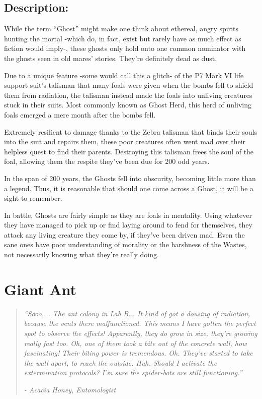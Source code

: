 \documentclass[11pt,a4paper,twocolumn]{book}
\begin{document}
	\subsection*{Description:}
	While the term ``Ghost'' might make one think about ethereal, angry spirits hunting the mortal -which do, in fact, exist but rarely have as much effect as fiction would imply-, these ghosts only hold onto one common nominator with the ghosts seen in old mares' stories. They're definitely dead as dust. 
	
	Due to a unique feature -some would call this a glitch- of the P7 Mark VI life support suit's talisman that many foals were given when the bombs fell to shield them from radiation, the talisman instead made the foals into unliving creatures stuck in their suits. Most commonly known as Ghost Herd, this herd of unliving foals emerged a mere month after the bombs fell.
	
	\bigskip
	Extremely resilient to damage thanks to the Zebra talisman that binds their souls into the suit and repairs them, these poor creatures often went mad over their helpless quest to find their parents. Destroying this talisman frees the soul of the foal, allowing them the respite they've been due for 200 odd years.
	
	In the span of 200 years, the Ghosts fell into obscurity, becoming little more than a legend. Thus, it is reasonable that should one come across a Ghost, it will be a sight to remember.
	
	In battle, Ghosts are fairly simple as they are foals in mentality. Using whatever they have managed to pick up or find laying around to fend for themselves, they attack any living creature they come by, if they've been driven mad. Even the sane ones have poor understanding of morality or the harshness of the Wastes, not necessarily knowing what they're really doing.
	
	\clearpage
	
	\section*{Giant Ant}
	\begin{quote}
		\emph{``Sooo.... The ant colony in Lab B... It kind of got a dousing of radiation, because the vents there malfunctioned. This means I have gotten the perfect spot to observe the effects! Apparently, they do grow in size, they're growing really fast too. Oh, one of them took a bite out of the concrete wall, how fascinating! Their biting power is tremendous. Oh. They've started to take the wall apart, to reach the outside. Huh. Should I activate the extermination protocols? I'm sure the spider-bots are still functioning.''}
		
		\emph{-	Acacia Honey, Entomologist}
	\end{quote}
	
\end{document}
